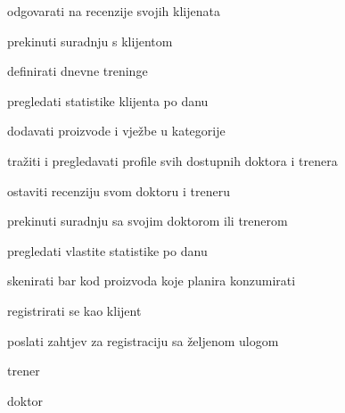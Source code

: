 \begin{packed_enum}
\begin{packed_enum}
					\item odgovarati na recenzije svojih klijenata
					\item prekinuti suradnju s klijentom
					\item definirati dnevne treninge
					\item pregledati statistike klijenta po danu
					\item dodavati proizvode i vježbe u kategorije
					
				\end{packed_enum}
			
				\item  {}
				
				\begin{packed_enum}
					
					\item tražiti i pregledavati profile svih dostupnih doktora i trenera
					\item ostaviti recenziju svom doktoru i treneru
					\item prekinuti suradnju sa svojim doktorom ili trenerom
					\item pregledati vlastite statistike po danu
					\item skenirati bar kod proizvoda koje planira konzumirati
					
				\end{packed_enum}
			
				\item  {}
				
				\begin{packed_enum}
					
					\item registrirati se kao klijent
					\item poslati zahtjev za registraciju sa željenom ulogom
					
					\begin{packed_enum}
						
						\item trener
						\item doktor	
						
					\end{packed_enum}
					
				\end{packed_enum}
			
				\item  {}
				

\end{packed_enum}
